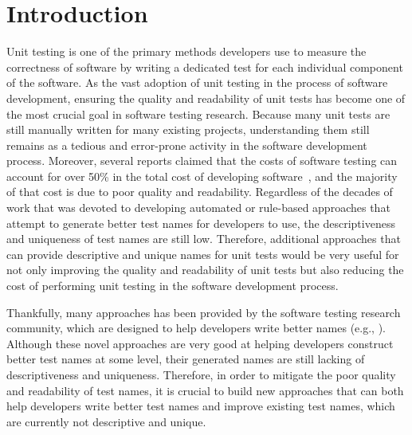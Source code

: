 \section{Introduction}
\label{sec:introduction}

Unit testing is one of the primary methods developers use to measure the correctness of software by writing a dedicated test for each individual component of the software. 
%
As the vast adoption of unit testing in the process of software development, ensuring the quality and readability of unit tests has become one of the most crucial goal in software testing research.
%
Because many unit tests are still manually written for many existing projects, understanding them still remains as a tedious and error-prone activity in the software development process.
%
Moreover, several reports claimed that the costs of software testing can account for over \num{50}\% in the total cost of developing software~\cite{anand2013orchestrated}, and the majority of that cost is due to poor quality and readability.
%
Regardless of the decades of work that was devoted to developing automated or rule-based approaches that attempt to generate better test names for developers to use, the descriptiveness and uniqueness of test names are still low.
%
Therefore, additional approaches that can provide descriptive and unique names for unit tests would be very useful for not only improving the quality and readability of unit tests but also reducing the cost of performing unit testing in the software development process.


Thankfully, many approaches has been provided by the software testing research community, which are designed to help developers write better names (e.g., \cite{host2009debugging,allamanis2014learning,pradel2018deepbugs,zhang2016towards,fraser2011evosuite,thummalapenta2009mseqgen,daka2017generating,allamanis2015suggesting}).
%
Although these novel approaches are very good at helping developers construct better test names at some level, their generated names are still lacking of descriptiveness and uniqueness.
%
Therefore, in order to mitigate the poor quality and readability of test names, it is crucial to build new approaches that can both help developers write better test names and improve existing test names, which are currently not descriptive and unique.


